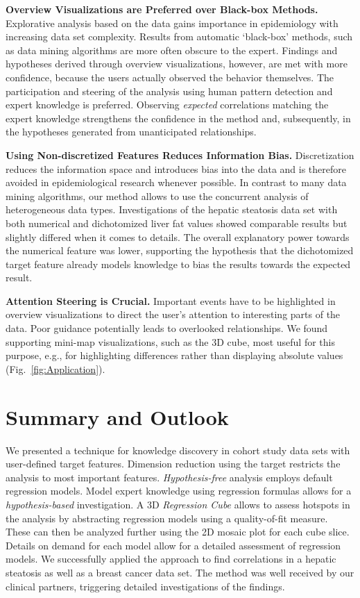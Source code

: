 \documentclass[journal]{style/vgtc} 			          %
\begin{document}
\textbf{Overview Visualizations are Preferred over Black-box Methods.}
Explorative analysis based on the data gains importance in epidemiology with increasing data set complexity.
Results from automatic `black-box' methods, such as data mining algorithms are more often obscure to the expert.
Findings and hypotheses derived through overview visualizations, however, are met with more confidence, because the users actually observed the behavior themselves.
The participation and steering of the analysis using human pattern detection and expert knowledge is preferred.
Observing \emph{expected} correlations matching the expert knowledge strengthens the confidence in the method and, subsequently, in the hypotheses generated from unanticipated relationships.

\textbf{Using Non-discretized Features Reduces Information Bias.}
Discretization reduces the information space and introduces bias into the data and is therefore avoided in epidemiological research whenever possible.
In contrast to many data mining algorithms, our method allows to use the concurrent analysis of heterogeneous data types.
Investigations of the hepatic steatosis data set with both numerical and dichotomized liver fat values showed comparable results but slightly differed when it comes to details.
The overall explanatory power towards the numerical feature was lower, supporting the hypothesis that the dichotomized target feature already models knowledge to bias the results towards the expected result.

\textbf{Attention Steering is Crucial.}
Important events have to be highlighted in overview visualizations to direct the user's attention to interesting parts of the data.
Poor guidance potentially leads to overlooked relationships.
We found supporting mini-map visualizations, such as the 3D cube, most useful for this purpose, e.g., for highlighting differences rather than displaying absolute values (Fig.~\ref{fig:Application}).
\section{Summary and Outlook}
We presented a technique for knowledge discovery in cohort study data sets with user-defined target features.
Dimension reduction using the target restricts the analysis to most important features.
\emph{Hypothesis-free} analysis employs default regression models.
Model expert knowledge using regression formulas allows for a \emph{hypothesis-based} investigation.
A 3D \emph{Regression Cube} allows to assess hotspots in the analysis by abstracting regression models using a quality-of-fit measure.
These can then be analyzed further using the 2D mosaic plot for each cube slice.
Details on demand for each model allow for a detailed assessment of regression models.
We successfully applied the approach to find correlations in a hepatic steatosis as well as a breast cancer data set.
The method was well received by our clinical partners, triggering detailed investigations of the findings.
\end{document}
